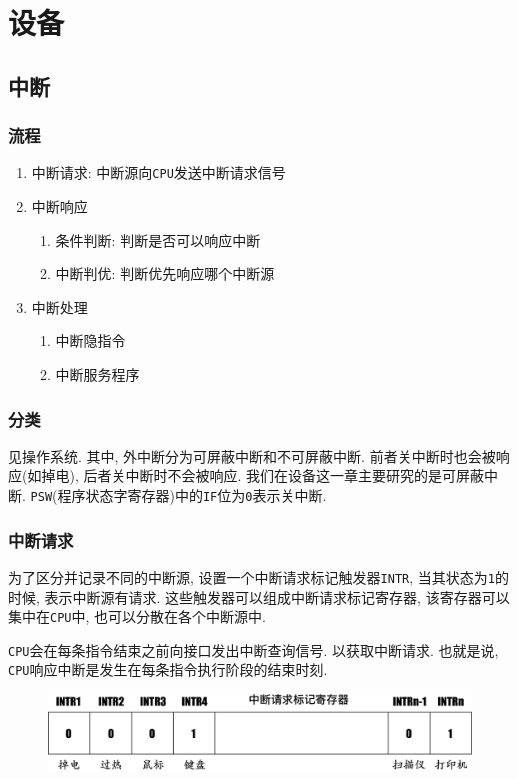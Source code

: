 \chapter{设备}
\section{中断}
\subsection{流程}
\begin{enumerate}
\item 中断请求: 中断源向\verb|CPU|发送中断请求信号
\item 中断响应
\begin{enumerate}
\item 条件判断: 判断是否可以响应中断
\item 中断判优: 判断优先响应哪个中断源
\end{enumerate}
\item 中断处理
\begin{enumerate}
\item 中断隐指令
\item 中断服务程序
\end{enumerate}
\end{enumerate}
\subsection{分类}
见操作系统. 其中, 外中断分为{\heiti 可屏蔽中断}和{\heiti 不可屏蔽中断}. 前者关中断时也会被响应(如掉电), 后者关中断时不会被响应. 我们在设备这一章主要研究的是{\heiti 可屏蔽中断}. \verb|PSW|(程序状态字寄存器)中的\verb|IF|位为\verb|0|表示关中断.
\subsection{中断请求}
为了区分并记录不同的中断源, 设置一个{\heiti 中断请求标记触发器}\verb|INTR|, 当其状态为\verb|1|的时候, 表示中断源有请求. 这些触发器可以组成{\heiti 中断请求标记寄存器}, 该寄存器可以集中在\verb|CPU|中, 也可以分散在各个中断源中.\par
\verb|CPU|会在每条指令结束之前向接口发出{\heiti 中断查询信号}. 以获取中断请求. 也就是说, \verb|CPU|响应中断是发生在每条指令执行阶段的结束时刻.
\begin{figure}[H]
\centering
\includegraphics[scale=.4]{img/figure55}
\end{figure}
